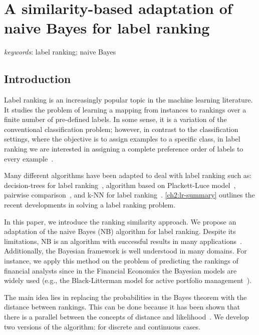 \documentclass[a4paper,12pt,openright,notitlepage]{report}\usepackage[]{graphicx}\usepackage[]{color}
\begin{document}
\chapter{A similarity-based adaptation of naive Bayes for label ranking}
\label{ch2}
\begin{abstract}

\end{abstract}
\textit{keywords}: label ranking; naive Bayes \\








\section{Introduction}
Label ranking is an increasingly popular topic in the machine learning literature. It studies the problem of learning a mapping from instances to rankings over a finite number of pre-defined labels. In some sense, it is a variation of the conventional classification problem; however, in contrast to the classification settings, where the objective is to assign examples to a specific class, in label ranking we are interested in assigning a complete preference order of labels to every example~\citep{cheng2009}.

Many different algorithms have been adapted to deal with label ranking such as: decision-trees for label ranking~\citep{cheng2009}, algorithm based on Plackett-Luce model~\citep{cheng2010}, pairwise comparison~\citep{hullermeier}, and k-NN for label ranking~\citep{brazdil2003}. \ref{ch2:lr-summary} outlines the recent developments in solving a label ranking problem.

In this paper, we introduce the ranking similarity approach. We propose an adaptation of the naive Bayes (NB) algorithm for label ranking. Despite its limitations, NB is an algorithm with successful results in many applications~\citep{domingos1997}. Additionally, the Bayesian framework is well understood in many domains. For instance, we apply this method on the problem of predicting the rankings of financial analysts since in the Financial Economics the Bayesian models are widely used (e.g., the Black-Litterman model for active portfolio management~\citep{black1992}).

The main idea lies in replacing the probabilities in the Bayes theorem with the distance between rankings. This can be done because it has been shown that there is a parallel between the concepts of distance and likelihood~\citep{vogt2007}. We develop two versions of the algorithm: for discrete and continuous cases.
\end{document}
